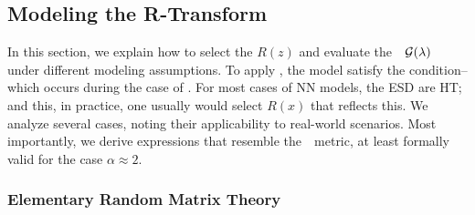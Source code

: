 \subsection{Modeling the R-Transform}
\label{sxn:r_transforms}


In this section, we explain how to select the \RTransform $R(z)$ and evaluate the~\GEN~$\mathcal{G(\lambda)}$ under different modeling assumptions.
To apply \SETOL, the model satisfy the \TRACELOG condition--which occurs during the case of  \IdealLearning.
For most cases of NN models, the ESD are HT; and this, in practice, one usually would select $R(x)$ that reflects this. 
We analyze several cases, noting their applicability to real-world scenarios.
Most importantly,  we derive expressions that resemble the~\WW~\ALPHAHAT metric, at least formally valid
for the case $\alpha\approx 2$.



\subsubsection{Elementary Random Matrix Theory}
\label{sxn:r_transforms:elementary_rmt}

